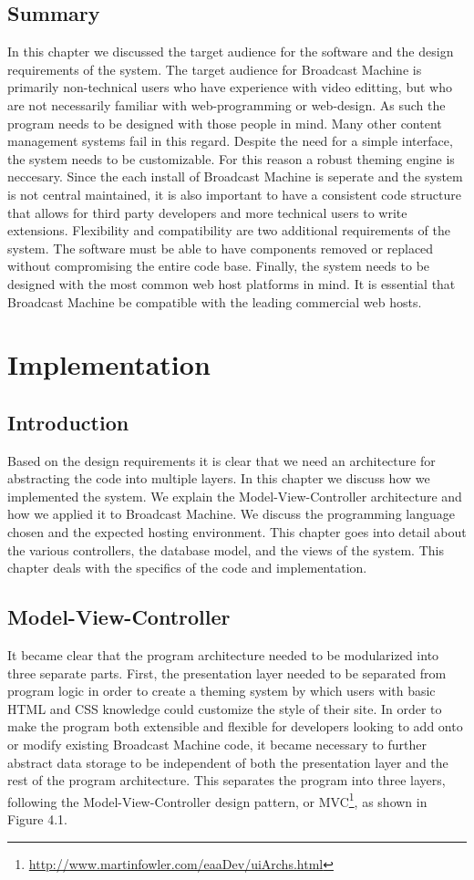 \documentclass[a4paper,12pt]{report}
\begin{document}
\section{Summary}
In this chapter we discussed the target audience for the software and the design requirements of the system. The target audience for 
Broadcast Machine is primarily non-technical users who have experience with 
video editting, but who are not 
necessarily familiar with web-programming or web-design. As such the program needs to be designed with those people in mind.
Many other content management systems fail in this regard. Despite the need for a simple interface, the system needs to be 
customizable. For this reason a robust theming engine is neccesary. Since the each install of Broadcast Machine is seperate and the system 
is not central maintained, it is also important 
to have a consistent code structure that allows for third party developers and more technical users to write extensions. 
Flexibility and compatibility are two additional requirements of the system. The software must be able to 
have components removed or 
replaced without compromising the entire code base. Finally, the system needs to be designed with the most common web host platforms in 
mind. It is essential that Broadcast Machine be compatible with the leading commercial web hosts.

\chapter{Implementation}

\section{Introduction}
Based on the design requirements it is clear that we need an architecture for abstracting the code into multiple layers. In this chapter 
we discuss how we implemented the system. We explain the Model-View-Controller architecture and how we applied it to 
Broadcast Machine. We discuss the programming language chosen and the expected hosting environment. This chapter goes into detail about 
the various controllers, the database model, and the views of the system. This chapter deals with the specifics of the code and 
implementation. 

\section{Model-View-Controller}
It became clear that the program architecture needed to be modularized into three separate parts. First, the presentation layer needed to 
be separated from program logic in order to create a theming system by which users with basic HTML and CSS knowledge could customize the style of their site. In order to make the program both extensible and flexible for developers looking to add onto or modify existing Broadcast Machine code, it became necessary to further abstract data storage to be independent of both the presentation layer and the rest of the program architecture. This separates the program into three layers, following the Model-View-Controller design pattern, or MVC\footnote{\url{http://www.martinfowler.com/eaaDev/uiArchs.html}}, as shown in Figure 4.1.
\end{document}
